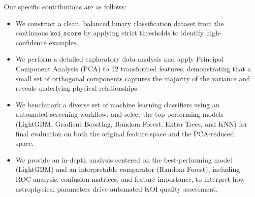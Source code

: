 Our specific contributions are as follows:
\begin{itemize}
    \item We construct a clean, balanced binary classification dataset from the continuous $\texttt{koi\_score}$ by applying strict thresholds to identify high-confidence examples.
    \item We perform a detailed exploratory data analysis and apply Principal Component Analysis (PCA) to 12 transformed features, demonstrating that a small set of orthogonal components captures the majority of the variance and reveals underlying physical relationships.
    \item We benchmark a diverse set of machine learning classifiers using an automated screening workflow, and select the top-performing models (LightGBM, Gradient Boosting, Random Forest, Extra Trees, and KNN) for final evaluation on both the original feature space and the PCA-reduced space.
    \item We provide an in-depth analysis centered on the best-performing model (LightGBM) and an interpretable comparator (Random Forest), including ROC analysis, confusion matrices, and feature importance, to interpret how astrophysical parameters drive automated KOI quality assessment.
\end{itemize}
